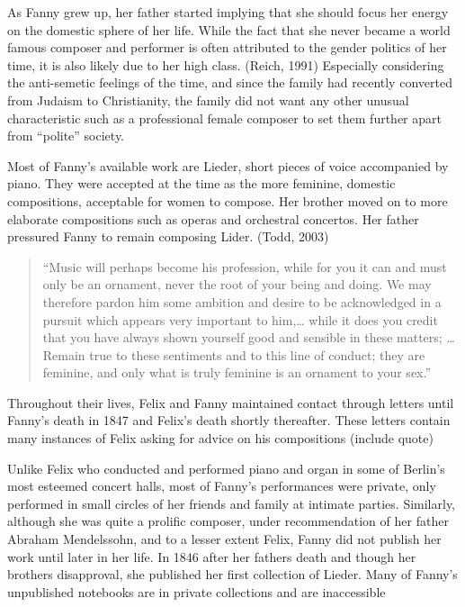 \documentclass[12pt,twoside]{reedthesis}
\theoremstyle{definition}
\theoremstyle{definition}
\theoremstyle{definition}
\theoremstyle{remark}
\begin{document}
As Fanny grew up, her father started implying that she should focus her
energy on the domestic sphere of her life. While the fact that she never
became a world famous composer and performer is often attributed to the
gender politics of her time, it is also likely due to her high class.
(Reich, 1991) Especially considering the anti-semetic feelings of the
time, and since the family had recently converted from Judaism to
Christianity, the family did not want any other unusual characteristic
such as a professional female composer to set them further apart from
``polite'' society.

Most of Fanny's available work are Lieder, short pieces of voice
accompanied by piano. They were accepted at the time as the more
feminine, domestic compositions, acceptable for women to compose. Her
brother moved on to more elaborate compositions such as operas and
orchestral concertos. Her father pressured Fanny to remain composing
Lider. (Todd, 2003)
\begin{quote}
``Music will perhaps become his profession, while for you it can and
must only be an ornament, never the root of your being and doing. We may
therefore pardon him some ambition and desire to be acknowledged in a
pursuit which appears very important to him,\ldots{} while it does you
credit that you have always shown yourself good and sensible in these
matters; \ldots{} Remain true to these sentiments and to this line of
conduct; they are feminine, and only what is truly feminine is an
ornament to your sex.''
\end{quote}
Throughout their lives, Felix and Fanny maintained contact through
letters until Fanny's death in 1847 and Felix's death shortly
thereafter. These letters contain many instances of Felix asking for
advice on his compositions (include quote)

Unlike Felix who conducted and performed piano and organ in some of
Berlin's most esteemed concert halls, most of Fanny's performances were
private, only performed in small circles of her friends and family at
intimate parties. Similarly, although she was quite a prolific composer,
under recommendation of her father Abraham Mendelssohn, and to a lesser
extent Felix, Fanny did not publish her work until later in her life. In
1846 after her fathers death and though her brothers disapproval, she
published her first collection of Lieder. Many of Fanny's unpublished
notebooks are in private collections and are inaccessible
\end{document}
